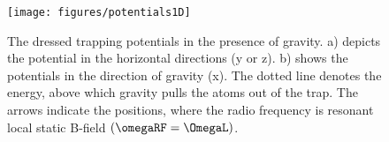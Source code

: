 \begin{figure}
 \texttt{[image: figures/potentials1D]}%
 \caption{The dressed trapping potentials in the presence of gravity\@. a) depicts the potential in the horizontal directions (y or z)\@. b) shows the potentials in the direction of gravity (x). 
 The dotted line denotes the energy, above which gravity pulls the atoms out of the trap. The arrows indicate the positions, where the radio frequency is resonant local static B-field $(\omegaRF=\OmegaL) $.\label{fig:potentials1D}}
 \end{figure}